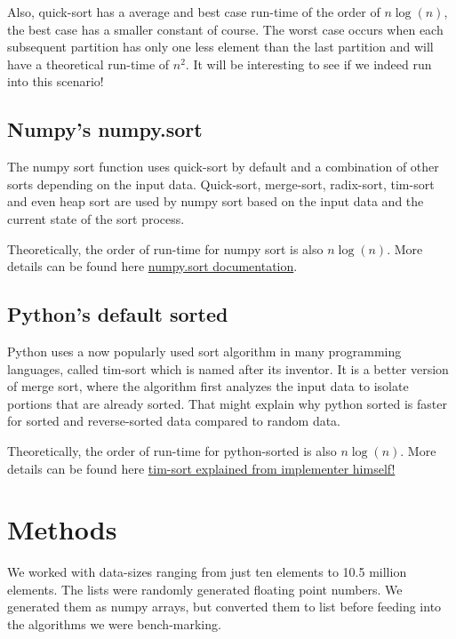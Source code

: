 \documentclass[sigconf, nonacm, natbib, screen, balance=False]{acmart}
\begin{document}
Also, quick-sort has a average and best case run-time of the order of $n\log(n)$, the best case has a smaller constant of course. The worst case occurs when each subsequent partition has only one less element than the last partition and will have a theoretical run-time of $n^2$. It will be interesting to see if we indeed run into this scenario!

\subsection{Numpy's numpy.sort}\label{sec:numpy sort}
The numpy sort function uses quick-sort by default and a combination of other sorts depending on the input data. Quick-sort, merge-sort, radix-sort, tim-sort and even heap sort are used by numpy sort based on the input data and the current state of the sort process.

Theoretically, the order of run-time for numpy sort is also $n\log(n)$. More details can be found here \citet{NumpySortDocumentation} \href{https://docs.scipy.org/doc/numpy/reference/generated/numpy.sort.html}{numpy.sort documentation}. 

\subsection{Python's default sorted}\label{sec:sorted sort}
Python uses a now popularly used sort algorithm in many programming languages, called tim-sort which is named after its
inventor. It is a better version of merge sort, where the algorithm first analyzes the input data to isolate portions that are already sorted. That might explain why python sorted is faster for sorted and reverse-sorted data compared to random data. 

Theoretically, the order of run-time for python-sorted  is also $n\log(n)$. More details can be found here \citet{TimPetersArticle} \href{https://github.com/python/cpython/blob/master/Objects/listsort.txt}{tim-sort explained from implementer himself!}

\section{Methods}\label{sec:methods}
We worked with data-sizes ranging from just ten elements to 10.5 million elements. The lists were randomly generated floating point numbers. We generated them as numpy arrays, but converted them to list before feeding into the algorithms we were bench-marking.
\end{document}

